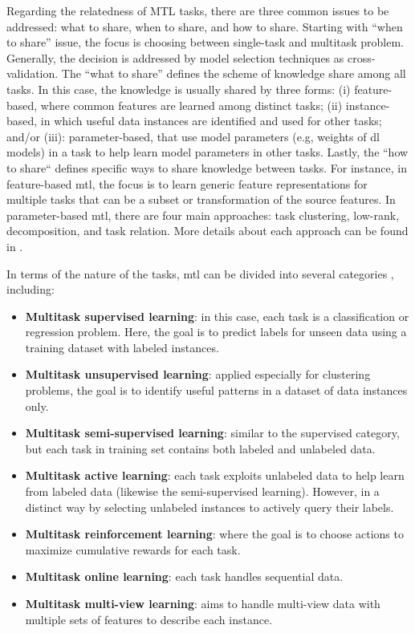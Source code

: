 Regarding the relatedness of MTL tasks, there are three common issues to be addressed: what to share, when to share, and how to share. Starting with ``when to share'' issue, the focus is choosing between single-task and multitask problem. Generally, the decision is addressed by model selection techniques as cross-validation. The ``what to share'' defines the scheme of knowledge share among all tasks. In this case, the knowledge is usually shared by three forms: (i) feature-based, where common features are learned among distinct tasks; (ii) instance-based, in which useful data instances are identified and used for other tasks; and/or (iii): parameter-based, that use model parameters (e.g, weights of \acl{dl} models) in a task to help learn model parameters in other tasks. Lastly, the ``how to share`` defines specific ways to share knowledge between tasks. For instance, in feature-based \acs{mtl}, the focus is to learn generic feature representations for multiple tasks that can be a subset or transformation of the source features. In parameter-based \acs{mtl}, there are four main approaches: task clustering, low-rank, decomposition, and task relation. More details about each approach can be found in \citep{zhang2017survey}.

In terms of the nature of the tasks, \acl{mtl} can be divided into several categories \citep{zhang2018overview}, including:

\begin{itemize}
\item \textbf{Multitask supervised learning}: in this case, each task is a classification or regression problem. Here, the goal is to predict labels for unseen data using a training dataset with labeled instances.

\item \textbf{Multitask unsupervised learning}: applied especially for clustering problems, the goal is to identify useful patterns in a dataset of data instances only.

\item \textbf{Multitask semi-supervised learning}: similar to the supervised category, but each task in training set contains both  labeled and unlabeled data.

\item \textbf{Multitask active learning}: each task exploits unlabeled data to help learn from labeled data (likewise the semi-supervised learning). However, in a distinct way by selecting unlabeled instances to actively query their labels.

\item \textbf{Multitask reinforcement learning}: where the goal is to choose actions to maximize cumulative rewards for each task.

\item \textbf{Multitask online learning}: each task handles sequential data.

\item \textbf{Multitask multi-view learning}: aims to handle multi-view data with multiple sets of features to describe each instance.
\end{itemize}

